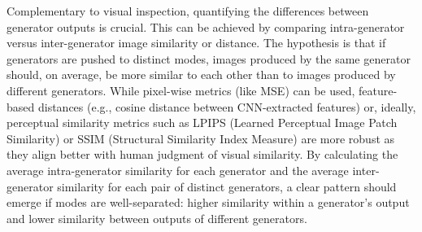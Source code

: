 Complementary to visual inspection, quantifying the differences between generator outputs is crucial. This can be achieved by comparing intra-generator versus inter-generator image similarity or distance. The hypothesis is that if generators are pushed to distinct modes, images produced by the same generator should, on average, be more similar to each other than to images produced by different generators. While pixel-wise metrics (like MSE) can be used, feature-based distances (e.g., cosine distance between CNN-extracted features) or, ideally, perceptual similarity metrics such as LPIPS (Learned Perceptual Image Patch Similarity) or SSIM (Structural Similarity Index Measure) are more robust as they align better with human judgment of visual similarity. By calculating the average intra-generator similarity for each generator and the average inter-generator similarity for each pair of distinct generators, a clear pattern should emerge if modes are well-separated: higher similarity within a generator's output and lower similarity between outputs of different generators.

\newpage